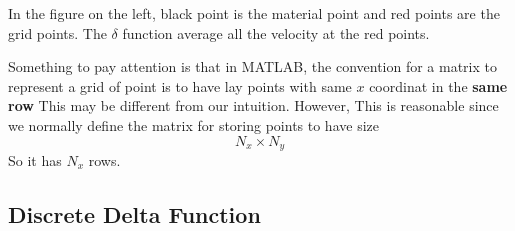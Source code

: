 \documentclass[../Immersed_Boundary_Method.tex]{subfiles}
\begin{document}
In the figure on the left, black point is the material point and red points are the grid points. The $\delta$ function average all the velocity at the red points. \par

Something to pay attention is that in MATLAB, the convention for a matrix to represent a grid of point is to have lay points with same $x$ coordinat in the \textbf{same row} This may be different from our intuition. However, This is reasonable since we normally define the matrix for storing points to have size 
\[ N_x \times N_y\]
So it has $N_x$ rows. \par

\subsection{Discrete Delta Function}
\end{document}
